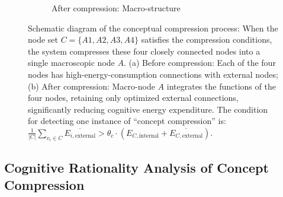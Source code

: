 \documentclass[10pt,onecolumn]{article}
\begin{document}
\begin{figure}[H]
\begin{subfigure}[b]{0.45\textwidth}
\caption{After compression: Macro-structure}
\end{subfigure}
\vspace{0.5cm}

\caption{Schematic diagram of the conceptual compression process: When the node set $C=\{A1,A2,A3,A4\}$ satisfies the compression conditions, the system compresses these four closely connected nodes into a single macroscopic node $A$. (a) Before compression: Each of the four nodes has high-energy-consumption connections with external nodes; (b) After compression: Macro-node $A$ integrates the functions of the four nodes, retaining only optimized external connections, significantly reducing cognitive energy expenditure. The condition for detecting one instance of “concept compression” is: $\frac{1}{|C|}\sum_{v_i\in C}\overline{E_{i,\text{external}}} > \theta_c\cdot(E_{C,\text{internal}}+\overline{E_{C,\text{external}}})$.}
\label{fig:compression_process}
\end{figure}

\subsection{Cognitive Rationality Analysis of Concept Compression}
\end{document}
